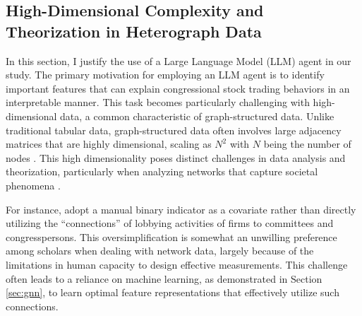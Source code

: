 \documentclass[15pt,letterpaper]{article}
\begin{document}

\subsection{High-Dimensional Complexity and Theorization in Heterograph Data}

In this section, I justify the use of a Large Language Model (LLM) agent in our study. The primary motivation for employing an LLM agent is to identify important features that can explain congressional stock trading behaviors in an interpretable manner. This task becomes particularly challenging with high-dimensional data, a common characteristic of graph-structured data. Unlike traditional tabular data, graph-structured data often involves large adjacency matrices that are highly dimensional, scaling as \( N^2 \) with \( N \) being the number of nodes \citep{Ward2011NetworkAA}.
This high dimensionality poses distinct challenges in data analysis and theorization, particularly when analyzing networks that capture societal phenomena \citep{Tang2012FeatureSW, Thi2013FeaturesEF}. 

For instance, \cite{eg14} adopt a manual binary indicator as a covariate rather than directly utilizing the ``connections'' of lobbying activities of firms to committees and congresspersons. This oversimplification is somewhat an unwilling preference among scholars when dealing with network data, largely because of the limitations in human capacity to design effective measurements. This challenge often leads to a reliance on machine learning, as demonstrated in Section \ref{sec:gnn}, to learn optimal feature representations that effectively utilize such connections.
\end{document}
